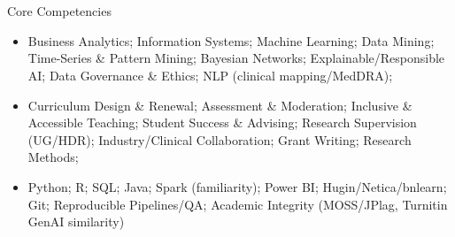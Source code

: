 \section{\faBuilding}{Core Competencies}
\begin{itemize}[noitemsep]
    \item Business Analytics; Information Systems; Machine Learning; Data Mining; Time-Series \& Pattern Mining; Bayesian Networks; Explainable/Responsible AI; Data Governance \& Ethics; NLP (clinical mapping/MedDRA);
    \item Curriculum Design \& Renewal; Assessment \& Moderation; Inclusive \& Accessible Teaching; Student Success \& Advising; Research Supervision (UG/HDR); Industry/Clinical Collaboration; Grant Writing; Research Methods;
    \item Python; R; SQL; Java; Spark (familiarity); Power BI; Hugin/Netica/bnlearn; Git; Reproducible Pipelines/QA; Academic Integrity (MOSS/JPlag, Turnitin GenAI similarity)

\end{itemize}